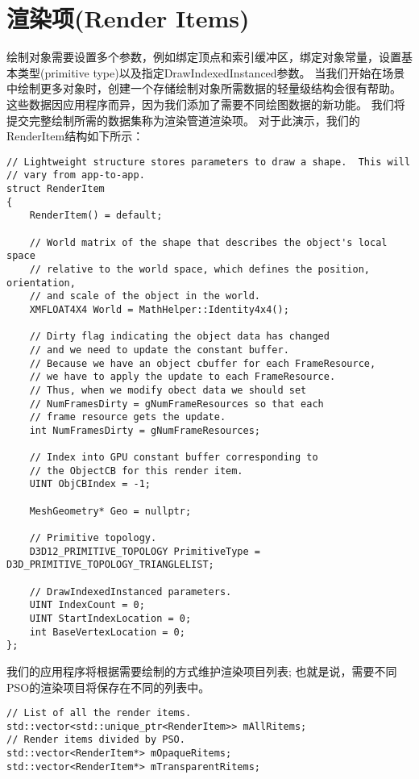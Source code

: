\section{渲染项(Render Items)}
\begin{flushleft}
绘制对象需要设置多个参数，例如绑定顶点和索引缓冲区，绑定对象常量，设置基本类型(primitive type)以及指定DrawIndexedInstanced参数。 当我们开始在场景中绘制更多对象时，创建一个存储绘制对象所需数据的轻量级结构会很有帮助。 这些数据因应用程序而异，因为我们添加了需要不同绘图数据的新功能。 我们将提交完整绘制所需的数据集称为渲染管道渲染项。 对于此演示，我们的RenderItem结构如下所示：\\
\end{flushleft}
\begin{lstlisting}
// Lightweight structure stores parameters to draw a shape.  This will
// vary from app-to-app.
struct RenderItem
{
    RenderItem() = default;

    // World matrix of the shape that describes the object's local space
    // relative to the world space, which defines the position, orientation,
    // and scale of the object in the world.
    XMFLOAT4X4 World = MathHelper::Identity4x4();

    // Dirty flag indicating the object data has changed 
    // and we need to update the constant buffer.
    // Because we have an object cbuffer for each FrameResource, 
    // we have to apply the update to each FrameResource.  
    // Thus, when we modify obect data we should set 
    // NumFramesDirty = gNumFrameResources so that each 
    // frame resource gets the update.
    int NumFramesDirty = gNumFrameResources;

    // Index into GPU constant buffer corresponding to 
    // the ObjectCB for this render item.
    UINT ObjCBIndex = -1;

    MeshGeometry* Geo = nullptr;

    // Primitive topology.
    D3D12_PRIMITIVE_TOPOLOGY PrimitiveType = D3D_PRIMITIVE_TOPOLOGY_TRIANGLELIST;

    // DrawIndexedInstanced parameters.
    UINT IndexCount = 0;
    UINT StartIndexLocation = 0;
    int BaseVertexLocation = 0;
};
\end{lstlisting}
\begin{flushleft}
我们的应用程序将根据需要绘制的方式维护渲染项目列表; 也就是说，需要不同PSO的渲染项目将保存在不同的列表中。\\
\end{flushleft}
\begin{lstlisting}
// List of all the render items.
std::vector<std::unique_ptr<RenderItem>> mAllRitems;
// Render items divided by PSO.
std::vector<RenderItem*> mOpaqueRitems;
std::vector<RenderItem*> mTransparentRitems;
\end{lstlisting}

